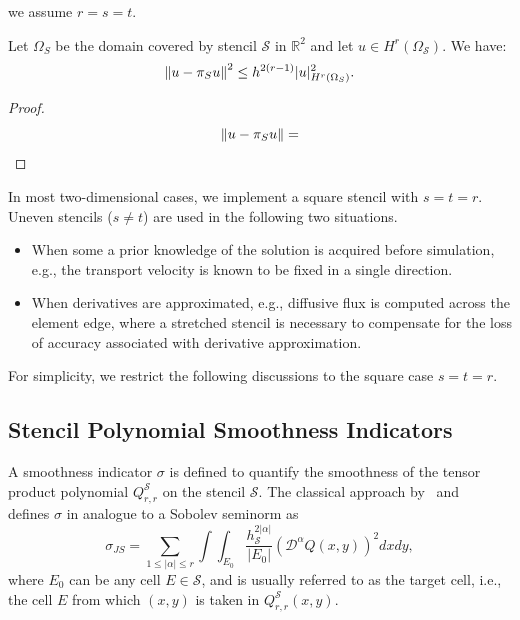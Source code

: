 we assume $r=s=t$. 
\begin{lem}\label{lem:interpolation}
Let $\Omega_S$ be the domain covered by stencil $\mathcal{S}$ in $\mathbb{R}^2$ and let $u\in H^r(\Omega_\mathcal{S})$. We have: 
\begin{equation}
\left\lVert u-\pi_Su\right\rVert^2 \leq h^{2(r-1)} |u|^2_{H^r(\Omega_S)}.
\end{equation}
\end{lem}

\begin{proof}
\begin{equation}
\left\lVert u-\pi_S u\right\rVert = 
\end{equation}
\end{proof}
\fi

In most two-dimensional cases,
we implement a square stencil with $s=t=r$.
Uneven stencils ($s \neq t$) are used in the following two situations.
\begin{itemize}
\item When some a prior knowledge of the solution is acquired before simulation, e.g.,
the transport velocity is known to be fixed in a single direction. 

\item When derivatives are approximated, e.g., diffusive flux is computed across the element edge, where a stretched stencil is necessary to compensate for the loss of accuracy associated with derivative approximation.
\end{itemize}
For simplicity, we restrict the following discussions to the square case $s=t=r$.

\subsection{Stencil Polynomial Smoothness Indicators}
A smoothness indicator $\sigma$ is defined to quantify the
smoothness of the tensor product polynomial $Q^\mathcal{S}_{r,r}$ on the stencil $\mathcal{S}$. 
The classical approach by~\cite{JSSmoothness} and~\cite{FRIEDRICH1998194} defines $\sigma$ in analogue to 
a Sobolev seminorm as
\begin{equation}
		  \sigma_{JS} = \sum_{1\leq \lvert\alpha\rvert \leq r} 
		  \int\int_{E_0} \frac{h_\mathcal{S}^{2\lvert\alpha\rvert}}{\lvert E_0 \rvert} 
		  (\mathcal{D}^\alpha Q(x,y))^2 dxdy,
\end{equation}
where $E_0$ can be any cell $E \in \mathcal{S}$, and is usually referred to as
the target cell, i.e., the cell $E$ from which $(x,y)$ is taken in $Q^\mathcal{S}_{r,r}(x,y)$.

